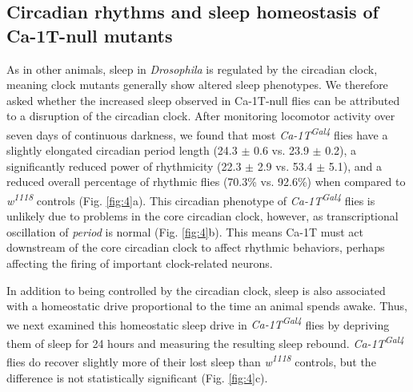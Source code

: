 \subsection*{Circadian rhythms and sleep homeostasis of Ca-\alpha1T-null mutants}

As in other animals, sleep in \emph{Drosophila} is regulated by the circadian clock, meaning clock mutants generally show altered sleep phenotypes\cite{hendricks:2003aa, parisky:2008aa}.
We therefore asked whether the increased sleep observed in Ca-\alpha1T-null flies can be attributed to a disruption of the circadian clock.
After monitoring locomotor activity over seven days of continuous darkness, we found that most \emph{Ca-\alpha1T\textsuperscript{Gal4}} flies have a slightly elongated circadian period length (24.3 $\pm$ 0.6 vs. 23.9 $\pm$ 0.2), a significantly reduced power of rhythmicity (22.3 $\pm$ 2.9 vs. 53.4 $\pm$ 5.1), and a reduced overall percentage of rhythmic flies (70.3\% vs. 92.6\%) when compared to \emph{w\textsuperscript{1118}} controls (Fig. \ref{fig:4}a).
This circadian phenotype of \emph{Ca-\alpha1T\textsuperscript{Gal4}} flies is unlikely due to problems in the core circadian clock, however, as transcriptional oscillation of \emph{period} is normal (Fig. \ref{fig:4}b).
This means Ca-\alpha1T must act downstream of the core circadian clock to affect rhythmic behaviors, perhaps affecting the firing of important clock-related neurons.

In addition to being controlled by the circadian clock, sleep is also associated with a homeostatic drive proportional to the time an animal spends awake. Thus, we next examined this homeostatic sleep drive in \emph{Ca-\alpha1T\textsuperscript{Gal4}} flies by depriving them of sleep for 24 hours and measuring the resulting sleep rebound. \emph{Ca-\alpha1T\textsuperscript{Gal4}} flies do recover slightly more of their lost sleep than \emph{w\textsuperscript{1118}} controls, but the difference is not statistically significant (Fig. \ref{fig:4}c).
